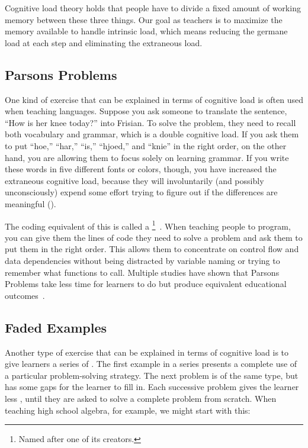 Cognitive load theory holds that
people have to divide a fixed amount of working memory between these three things.
Our goal as teachers is to maximize the memory available to handle intrinsic load,
which means reducing the germane load at each step and eliminating the extraneous load.

\subsection*{Parsons Problems}

One kind of exercise that can be explained in terms of cognitive load
is often used when teaching languages.
Suppose you ask someone to translate the sentence, ``How is her knee today?'' into Frisian.
To solve the problem,
they need to recall both vocabulary and grammar,
which is a double cognitive load.
If you ask them to put ``hoe,'' ``har,'' ``is,'' ``hjoed,'' and ``knie'' in the right order,
on the other hand,
you are allowing them to focus solely on learning grammar.
If you write these words in five different fonts or colors,
though,
you have increased the extraneous cognitive load,
because they will involuntarily (and possibly unconsciously) expend some effort
trying to figure out if the differences are meaningful
().


The coding equivalent of this
is called a \footnote{Named after one of its creators.}~\cite{Pars2006}.
When teaching people to program,
you can give them the lines of code they need to solve a problem
and ask them to put them in the right order.
This allows them to concentrate on control flow and data dependencies
without being distracted by variable naming or trying to remember what functions to call.
Multiple studies have shown that Parsons Problems take less time for learners to do
but produce equivalent educational outcomes~\cite{Eric2017}.

\subsection*{Faded Examples}

Another type of exercise that can be explained in terms of cognitive load
is to give learners a series of .
The first example in a series presents a complete use of a particular problem-solving strategy.
The next problem is of the same type,
but has some gaps for the learner to fill in.
Each successive problem gives the learner less ,
until they are asked to solve a complete problem from scratch.
When teaching high school algebra,
for example,
we might start with this:

